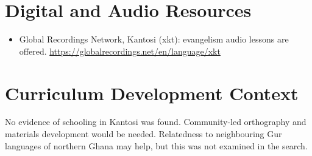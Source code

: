 \documentclass[12pt]{article}
\begin{document}
\section{Digital and Audio Resources}
\begin{itemize}
\item Global Recordings Network, Kantosi (xkt): evangelism audio lessons are offered. \url{https://globalrecordings.net/en/language/xkt}
\end{itemize}

\section{Curriculum Development Context}
No evidence of schooling in Kantosi was found. Community-led orthography and materials development would be needed. Relatedness to neighbouring Gur languages of northern Ghana may help, but this was not examined in the search.
\end{document}
